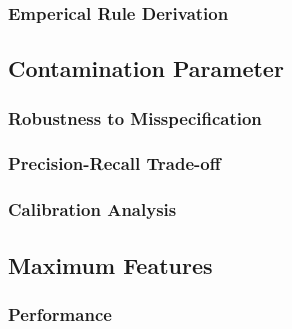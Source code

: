 \documentclass[10pt, conference]{IEEEtran}
\begin{document}


\subsubsection{Emperical Rule Derivation}



\subsection{Contamination Parameter}
\subsubsection{Robustness to Misspecification}




\subsubsection{Precision-Recall Trade-off}
%
%
%

\subsubsection{Calibration Analysis}


\subsection{Maximum Features}
\subsubsection{Performance}




\end{document}
